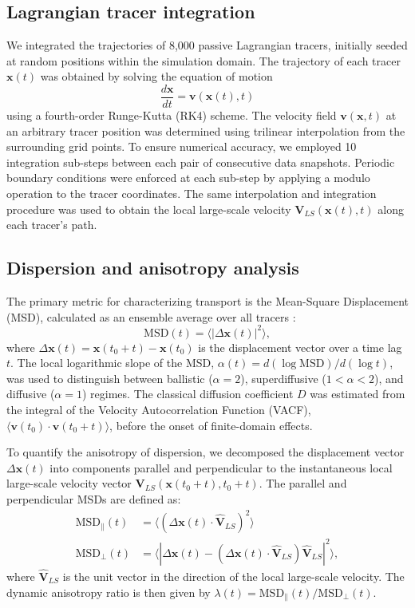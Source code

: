 \documentclass[]{article}
\begin{document}
\subsection{Lagrangian tracer integration}
We integrated the trajectories of 8,000 passive Lagrangian tracers, initially seeded at random positions within the simulation domain. The trajectory of each tracer $\mathbf{x}(t)$ was obtained by solving the equation of motion
\begin{equation}
\frac{d\mathbf{x}}{dt} = \mathbf{v}(\mathbf{x}(t), t)
\end{equation}
using a fourth-order Runge-Kutta (RK4) scheme. The velocity field $\mathbf{v}(\mathbf{x}, t)$ at an arbitrary tracer position was determined using trilinear interpolation from the surrounding grid points. To ensure numerical accuracy, we employed 10 integration sub-steps between each pair of consecutive data snapshots. Periodic boundary conditions were enforced at each sub-step by applying a modulo operation to the tracer coordinates. The same interpolation and integration procedure was used to obtain the local large-scale velocity $\mathbf{V}_{LS}(\mathbf{x}(t), t)$ along each tracer's path.

\subsection{Dispersion and anisotropy analysis}
The primary metric for characterizing transport is the Mean-Square Displacement (MSD), calculated as an ensemble average over all tracers \citep{katayama2025notetwopointmeansquare}:
\begin{equation}
\text{MSD}(t) = \langle |\Delta\mathbf{x}(t)|^2 \rangle,
\end{equation}
where $\Delta\mathbf{x}(t) = \mathbf{x}(t_0+t) - \mathbf{x}(t_0)$ is the displacement vector over a time lag $t$. The local logarithmic slope of the MSD, $\alpha(t) = d(\log \text{MSD}) / d(\log t)$, was used to distinguish between ballistic ($\alpha=2$), superdiffusive ($1 < \alpha < 2$), and diffusive ($\alpha=1$) regimes. The classical diffusion coefficient $D$ was estimated from the integral of the Velocity Autocorrelation Function (VACF), $\langle \mathbf{v}(t_0) \cdot \mathbf{v}(t_0+t) \rangle$, before the onset of finite-domain effects.

To quantify the anisotropy of dispersion, we decomposed the displacement vector $\Delta\mathbf{x}(t)$ into components parallel and perpendicular to the instantaneous local large-scale velocity vector $\mathbf{V}_{LS}(\mathbf{x}(t_0+t), t_0+t)$. The parallel and perpendicular MSDs are defined as:
\begin{align}
\text{MSD}_{\parallel}(t) &= \langle (\Delta\mathbf{x}(t) \cdot \hat{\mathbf{V}}_{LS})^2 \rangle \\
\text{MSD}_{\perp}(t) &= \langle |\Delta\mathbf{x}(t) - (\Delta\mathbf{x}(t) \cdot \hat{\mathbf{V}}_{LS}) \hat{\mathbf{V}}_{LS}|^2 \rangle,
\end{align}
where $\hat{\mathbf{V}}_{LS}$ is the unit vector in the direction of the local large-scale velocity. The dynamic anisotropy ratio is then given by $\lambda(t) = \text{MSD}_{\parallel}(t) / \text{MSD}_{\perp}(t)$.
\end{document}
